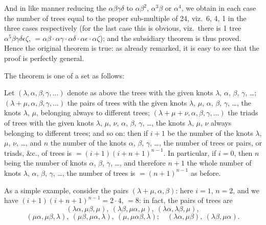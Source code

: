 \documentclass[11pt,a4paper]{article}
\begin{document}
And in like manner reducing the $\alpha\beta\gamma\delta$ to $\alpha\beta^2$, $\alpha^3\beta$ or $\alpha^4$, we obtain in each case the number of trees equal to the proper sub-multiple of 24, viz.\ 6, 4, 1 in the three cases respectively (for the last case this is obvious, viz.\ there is 1 tree $\alpha^5\beta\gamma\delta\epsilon\zeta$, $= \alpha\beta \cdot \alpha\gamma \cdot \alpha\delta \cdot \alpha\epsilon \cdot \alpha\zeta$); and the subsidiary theorem is thus proved. Hence the original theorem is true: as already remarked, it is easy to see that the proof is perfectly general.

The theorem is one of a set as follows:

Let $(\lambda, \alpha, \beta, \gamma, \ldots)$ denote as above the trees with the given knots $\lambda$, $\alpha$, $\beta$, $\gamma$, \ldots; $(\lambda + \mu, \alpha, \beta, \gamma, \ldots)$ the pairs of trees with the given knots $\lambda$, $\mu$, $\alpha$, $\beta$, $\gamma$, \ldots, the knots $\lambda$, $\mu$, belonging always to different trees; $(\lambda + \mu + \nu, \alpha, \beta, \gamma, \ldots)$ the triads of trees with the given knots $\lambda$, $\mu$, $\nu$, $\alpha$, $\beta$, $\gamma$, \ldots, the knots $\lambda$, $\mu$, $\nu$ always belonging to different trees; and so on: then if $i + 1$ be the number of the knots $\lambda$, $\mu$, $\nu$, \ldots, and $n$ the number of the knots $\alpha$, $\beta$, $\gamma$, \ldots, the number of trees or pairs, or triads, \&c., of trees is $= (i + 1)(i + n + 1)^{n-1}$. In particular, if $i = 0$, then $n$ being the number of knots $\alpha$, $\beta$, $\gamma$, \ldots, and therefore $n + 1$ the whole number of knots $\lambda$, $\alpha$, $\beta$, $\gamma$, \ldots, the number of trees is $= (n + 1)^{n-1}$ as before.

As a simple example, consider the pairs $(\lambda + \mu, \alpha, \beta)$: here $i = 1$, $n = 2$, and we have $(i + 1)(i + n + 1)^{n-1} = 2 \cdot 4$, $=8$: in fact, the pairs of trees are
\[
(\lambda\alpha, \mu\beta, \mu),\ (\lambda\beta, \mu\alpha, \mu),\ (\lambda\alpha, \lambda\beta, \mu),
\]
\[
(\mu\alpha, \mu\beta, \lambda),\ (\mu\beta, \mu\alpha, \lambda),\ (\mu, \mu\alpha\beta, \lambda);\quad (\lambda\alpha, \mu\beta),\ (\lambda\beta, \mu\alpha).
\]
\end{document}
